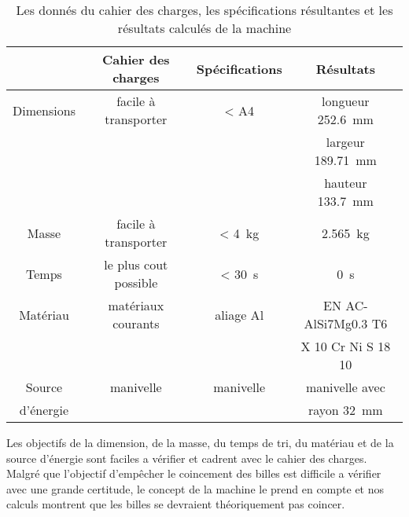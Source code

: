\begin{table}[htbp]
    \centering
    \begin{tabular}{|c|c|c|c|}
        \hline
         & \textbf{Cahier des charges} & \textbf{Spécifications} & \textbf{Résultats}\\
        \hline
        Dimensions & facile à transporter & < A4 & longueur \SI{252.6}{\milli\metre} \\
        & & & largeur \SI{189.71}{\milli\metre} \\
        & & & hauteur \SI{133.7}{\milli\metre} \\
        \hline
        Masse & facile à transporter & \SI{< 4}{\kilo\gram} & \SI{2.565}{\kilo\gram} \\
        \hline
        Temps & le plus cout possible & \SI{< 30}{\second} & \SI{0}{\second} \\
        \hline
        Matériau & matériaux courants & aliage Al & EN AC-AlSi7Mg0.3 T6 \\
        & & & X 10 Cr Ni S 18 10 \\
        \hline
        Source & manivelle & manivelle & manivelle avec \\
        d'énergie & & & rayon \SI{32}{\milli\metre}\\
        \hline
    \end{tabular}
    \caption{Les donnés du cahier des charges, les spécifications résultantes et les résultats calculés de la machine}
\end{table}

Les objectifs de la dimension, de la masse, du temps de tri, du matériau et de la source d'énergie sont faciles a vérifier et cadrent avec le cahier des charges. Malgré que l'objectif d'empêcher le coincement des billes est difficile a vérifier avec une grande certitude, le concept de la machine le prend en compte et nos calculs montrent que les billes se devraient théoriquement pas coincer. 